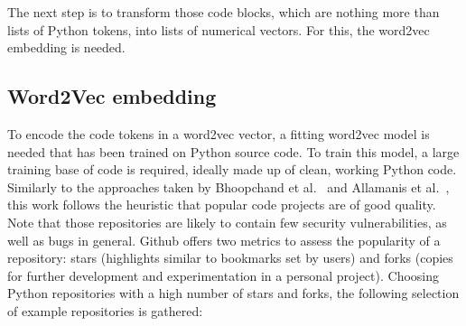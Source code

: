 \documentclass[
a4paper,
pagesize,
pdftex,
12pt,
twoside, %
BCOR=5mm, %
ngerman,
fleqn,
final,
]{scrartcl}
\begin{document}
	The next step is to transform those code blocks, which are nothing more than lists of Python tokens, into lists of numerical vectors. For this, the word2vec embedding is needed. 
	
	\subsection{Word2Vec embedding}
	To encode the code tokens in a word2vec vector, a fitting word2vec model is needed that has been trained on Python source code. To train this model, a large training base of code is required, ideally made up of clean, working Python code.\\
	Similarly to the approaches taken by Bhoopchand et al.~\cite{Bhoopchand.2016} and Allamanis et al.~\cite{Allamanis.2013}, this work follows the heuristic that popular code projects are of good quality. Note that those repositories are likely to contain few security vulnerabilities, as well as bugs in general. Github offers two metrics to assess the popularity of a repository: stars (highlights similar to bookmarks set by users) and forks (copies for further development and experimentation in a personal project). Choosing Python repositories with a high number of stars and forks, the following selection of example repositories is gathered:
	
\end{document}
